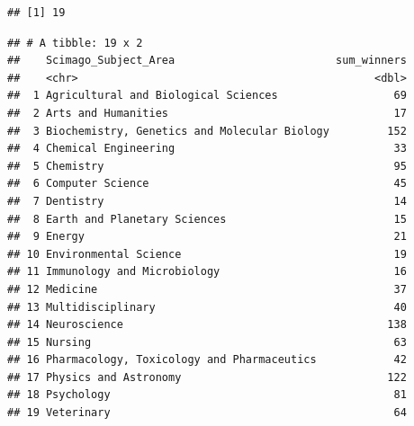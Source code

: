 \documentclass[
]{article}
\newenvironment{Shaded}{\begin{snugshade}}{\end{snugshade}}
\newcommand{\AttributeTok}[1]{\textcolor[rgb]{0.77,0.63,0.00}{#1}}
\newcommand{\CommentTok}[1]{\textcolor[rgb]{0.56,0.35,0.01}{\textit{#1}}}
\newcommand{\DecValTok}[1]{\textcolor[rgb]{0.00,0.00,0.81}{#1}}
\newcommand{\FunctionTok}[1]{\textcolor[rgb]{0.00,0.00,0.00}{#1}}
\newcommand{\NormalTok}[1]{#1}
\newcommand{\SpecialCharTok}[1]{\textcolor[rgb]{0.00,0.00,0.00}{#1}}
\newcommand{\StringTok}[1]{\textcolor[rgb]{0.31,0.60,0.02}{#1}}
\begin{document}
\begin{verbatim}
## [1] 19
\end{verbatim}

\begin{Shaded}
\end{Shaded}

\begin{verbatim}
## # A tibble: 19 x 2
##    Scimago_Subject_Area                         sum_winners
##    <chr>                                              <dbl>
##  1 Agricultural and Biological Sciences                  69
##  2 Arts and Humanities                                   17
##  3 Biochemistry, Genetics and Molecular Biology         152
##  4 Chemical Engineering                                  33
##  5 Chemistry                                             95
##  6 Computer Science                                      45
##  7 Dentistry                                             14
##  8 Earth and Planetary Sciences                          15
##  9 Energy                                                21
## 10 Environmental Science                                 19
## 11 Immunology and Microbiology                           16
## 12 Medicine                                              37
## 13 Multidisciplinary                                     40
## 14 Neuroscience                                         138
## 15 Nursing                                               63
## 16 Pharmacology, Toxicology and Pharmaceutics            42
## 17 Physics and Astronomy                                122
## 18 Psychology                                            81
## 19 Veterinary                                            64
\end{verbatim}

\begin{Shaded}
\end{Shaded}
\end{document}
